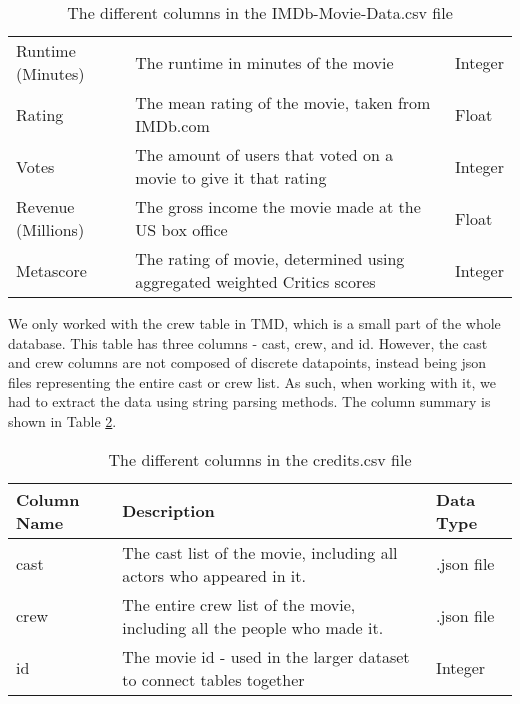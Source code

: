 \begin{table}[h]
\begin{tabular}{lp{10cm}l}
                Runtime (Minutes)  & The runtime in minutes of the movie                                        & Integer   \\
                Rating             & The mean rating of the movie, taken from IMDb.com                          & Float     \\
                Votes              & The amount of users that voted on a movie to give it that rating           & Integer   \\
                Revenue (Millions) & The gross income the movie made at the US box office                       & Float     \\
                Metascore          & The rating of movie, determined using aggregated weighted Critics scores   & Integer   \\
                \bottomrule
            \end{tabular}
            \caption[short]{The different columns in the IMDb-Movie-Data.csv file}\label{tab-IMDb-Movie-Data-Column-Description}
        \end{table}

        We only worked with the crew table in TMD, which is a small part of the whole
            database.
        This table has three columns - cast, crew, and id.
        However, the cast and crew columns are not composed of discrete datapoints,
            instead being json files representing the entire cast or crew list.
        As such, when working with it, we had to extract the data using string parsing
            methods.
        The column summary is shown in Table \ref*{tab-Credits-Column-Description}.
        \begin{table}[h]
            \centering
            \begin{tabular}{lp{10cm}l}
                \toprule
                Column Name & Description                                                              & Data Type  \\
                \midrule
                cast        & The cast list of the movie, including all actors who appeared in it.     & .json file \\
                crew        & The entire crew list of the movie, including all the people who made it. & .json file \\
                id          & The movie id - used in the larger dataset to connect tables together     & Integer    \\
                \bottomrule
            \end{tabular}
            \caption[short]{The different columns in the credits.csv file}\label{tab-Credits-Column-Description}
        \end{table}

